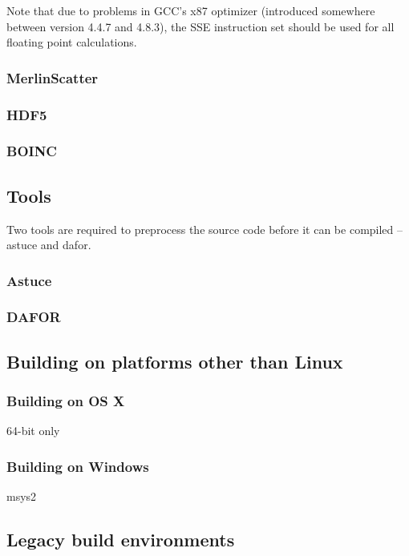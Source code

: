 \documentclass[english]{article}
\begin{document}
Note that due to problems in GCC's x87 optimizer (introduced somewhere between version 4.4.7 and 4.8.3), the SSE instruction set should be used for all floating point calculations.

\subsubsection{MerlinScatter}

\subsubsection{HDF5}

\subsubsection{BOINC}

\subsection{Tools}

Two tools are required to preprocess the source code before it can be compiled -- astuce and dafor.

\subsubsection{Astuce}

\subsubsection{DAFOR}

\subsection{Building on platforms other than Linux}

\subsubsection{Building on OS X}

64-bit only

\subsubsection{Building on Windows}

msys2

\subsection{Legacy build environments}
\end{document}
